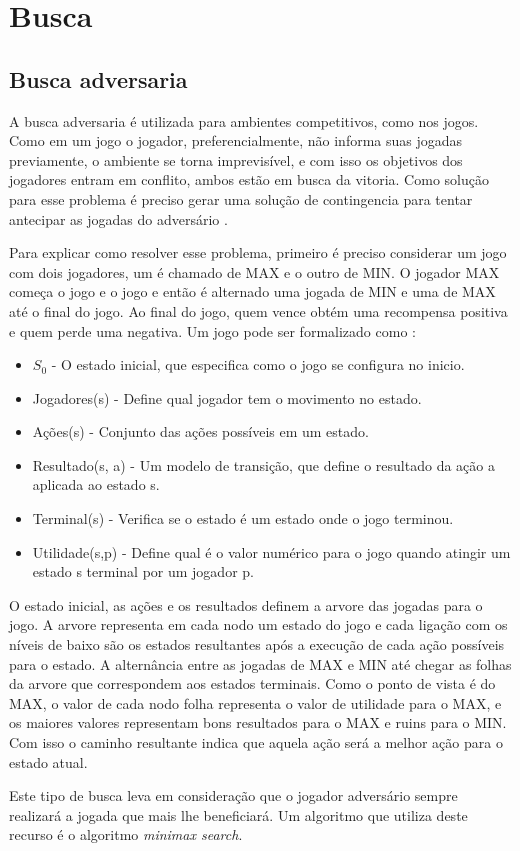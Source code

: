 \chapter{\label{chap:busca}Busca}



\section{Busca adversaria}

A busca adversaria é utilizada para ambientes competitivos, como nos jogos. Como em um jogo o jogador, preferencialmente, não informa suas jogadas previamente, o ambiente se torna imprevisível, e com isso os objetivos dos jogadores entram em conflito, ambos estão em busca da vitoria. Como solução para esse problema é preciso gerar uma solução de contingencia para tentar antecipar as jogadas do adversário \cite{intelligence2003modern}. 

Para explicar como resolver esse problema, primeiro é preciso considerar um jogo com dois jogadores, um é chamado de MAX e o outro de MIN. O jogador MAX começa o jogo e o jogo e então é alternado uma jogada de MIN e uma de MAX até o final do jogo. Ao final do jogo, quem vence obtém uma recompensa positiva e quem perde uma negativa. Um jogo pode ser formalizado como \cite{intelligence2003modern}:

\begin{itemize}
	\item $S_{0}$ - O estado inicial, que especifica como o jogo se configura no inicio.
	\item Jogadores(s) -  Define qual jogador tem o movimento no estado.
	\item Ações(s) - Conjunto das ações possíveis em um estado.
	\item Resultado(s, a) - Um modelo de transição, que define o resultado da ação a aplicada ao estado s.
	\item Terminal(s) - Verifica se o estado é um estado onde o jogo terminou.
	\item Utilidade(s,p) - Define qual é o valor numérico para o jogo quando atingir um estado s terminal por um jogador p. 
\end{itemize}

O estado inicial, as ações e os resultados definem a arvore das jogadas para o jogo. A arvore representa em cada nodo um estado do jogo e cada ligação com os níveis de baixo são os estados resultantes após a execução de cada ação possíveis para o estado. A alternância entre as jogadas de MAX e MIN até chegar as folhas da arvore que correspondem aos estados terminais. Como o ponto de vista é do MAX, o valor de cada nodo folha representa o valor de utilidade para o MAX, e os maiores valores representam bons resultados para o MAX e ruins para o MIN. Com isso o caminho resultante indica que aquela ação será a melhor ação para o estado atual. 


Este tipo de busca leva em consideração que o jogador adversário sempre realizará a jogada que mais lhe beneficiará. Um algoritmo que utiliza deste recurso é o algoritmo \textit{minimax search}.
